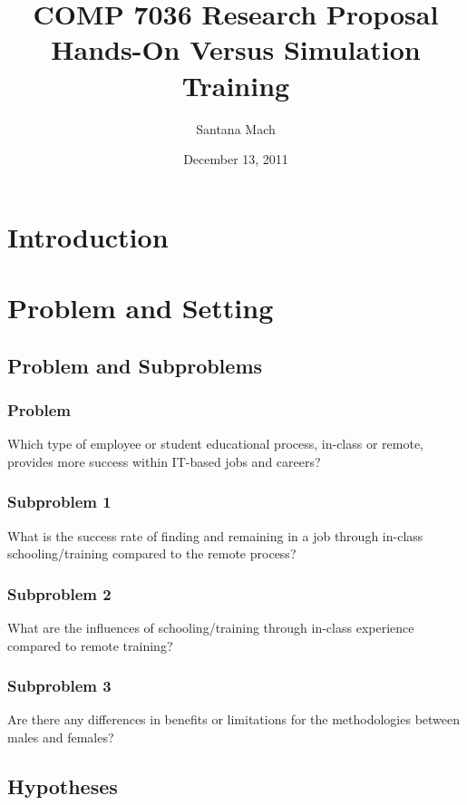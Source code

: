 \documentclass[titlepage]{article}
\begin{document}
\author{Santana Mach}
\title{COMP 7036 Research Proposal \\ Hands-On Versus Simulation Training}
\date{December 13, 2011}
\maketitle{}

\tableofcontents
\pagebreak
\linespread{1.5}

\section{Introduction}


\section{Problem and Setting}

\subsection{Problem and Subproblems}

\subsubsection{Problem}
Which type of employee or student educational process, in-class or remote,
provides more success within IT-based jobs and careers?

\subsubsection{Subproblem 1}
What is the success rate of finding and remaining in a job through in-class
schooling/training compared to the remote process?

\subsubsection{Subproblem 2}
What are the influences of schooling/training through in-class experience
compared to remote training?

\subsubsection{Subproblem 3}
Are there any differences in benefits or limitations for the methodologies between males
and females?

\subsection{Hypotheses}
\end{document}
